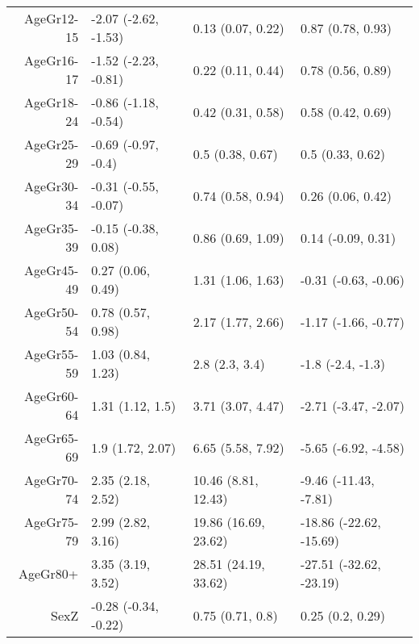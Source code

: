 \begin{table}[ht]
\begin{tabular}{rlll}
  AgeGr12-15 & -2.07 (-2.62, -1.53) & 0.13 (0.07, 0.22) & 0.87 (0.78, 0.93) \\ 
  AgeGr16-17 & -1.52 (-2.23, -0.81) & 0.22 (0.11, 0.44) & 0.78 (0.56, 0.89) \\ 
  AgeGr18-24 & -0.86 (-1.18, -0.54) & 0.42 (0.31, 0.58) & 0.58 (0.42, 0.69) \\ 
  AgeGr25-29 & -0.69 (-0.97, -0.4) & 0.5 (0.38, 0.67) & 0.5 (0.33, 0.62) \\ 
  AgeGr30-34 & -0.31 (-0.55, -0.07) & 0.74 (0.58, 0.94) & 0.26 (0.06, 0.42) \\ 
  AgeGr35-39 & -0.15 (-0.38, 0.08) & 0.86 (0.69, 1.09) & 0.14 (-0.09, 0.31) \\ 
  AgeGr45-49 & 0.27 (0.06, 0.49) & 1.31 (1.06, 1.63) & -0.31 (-0.63, -0.06) \\ 
  AgeGr50-54 & 0.78 (0.57, 0.98) & 2.17 (1.77, 2.66) & -1.17 (-1.66, -0.77) \\ 
  AgeGr55-59 & 1.03 (0.84, 1.23) & 2.8 (2.3, 3.4) & -1.8 (-2.4, -1.3) \\ 
  AgeGr60-64 & 1.31 (1.12, 1.5) & 3.71 (3.07, 4.47) & -2.71 (-3.47, -2.07) \\ 
  AgeGr65-69 & 1.9 (1.72, 2.07) & 6.65 (5.58, 7.92) & -5.65 (-6.92, -4.58) \\ 
  AgeGr70-74 & 2.35 (2.18, 2.52) & 10.46 (8.81, 12.43) & -9.46 (-11.43, -7.81) \\ 
  AgeGr75-79 & 2.99 (2.82, 3.16) & 19.86 (16.69, 23.62) & -18.86 (-22.62, -15.69) \\ 
  AgeGr80+ & 3.35 (3.19, 3.52) & 28.51 (24.19, 33.62) & -27.51 (-32.62, -23.19) \\ 
  SexZ & -0.28 (-0.34, -0.22) & 0.75 (0.71, 0.8) & 0.25 (0.2, 0.29) \\ 
   \hline
\end{tabular}
\end{table}
